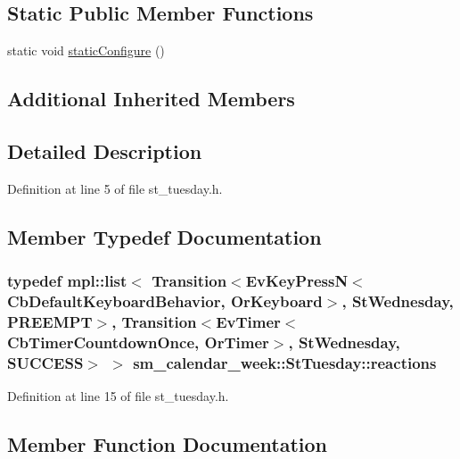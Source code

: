 \subsection*{Static Public Member Functions}
\begin{DoxyCompactItemize}
\item 
static void \hyperlink{structsm__calendar__week_1_1StTuesday_a1d0e3568187fa9cfd3181e2c951e8856}{static\+Configure} ()
\end{DoxyCompactItemize}
\subsection*{Additional Inherited Members}


\subsection{Detailed Description}


Definition at line 5 of file st\+\_\+tuesday.\+h.



\subsection{Member Typedef Documentation}
\subsubsection[{\texorpdfstring{reactions}{reactions}}]{\setlength{\rightskip}{0pt plus 5cm}typedef mpl\+::list$<$ Transition$<$Ev\+Key\+PressN$<$Cb\+Default\+Keyboard\+Behavior, {\bf Or\+Keyboard}$>$, {\bf St\+Wednesday}, {\bf P\+R\+E\+E\+M\+PT}$>$, Transition$<$Ev\+Timer$<$Cb\+Timer\+Countdown\+Once, {\bf Or\+Timer}$>$, {\bf St\+Wednesday}, {\bf S\+U\+C\+C\+E\+SS}$>$ $>$ {\bf sm\+\_\+calendar\+\_\+week\+::\+St\+Tuesday\+::reactions}}\hypertarget{structsm__calendar__week_1_1StTuesday_a8761617f08711bc2ba2e3b051c2b5337}{}\label{structsm__calendar__week_1_1StTuesday_a8761617f08711bc2ba2e3b051c2b5337}


Definition at line 15 of file st\+\_\+tuesday.\+h.



\subsection{Member Function Documentation}
